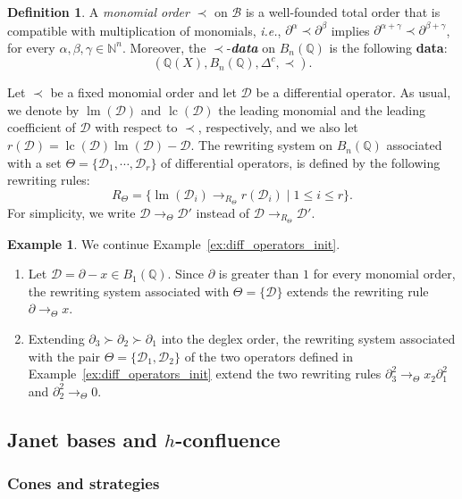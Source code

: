 \documentclass[10pt]{easychair}
\theoremstyle{definition}
\newtheorem{definition}[theorem]{Definition}
\newtheorem{example}[theorem]{Example}
\newcommand\ie{\emph{i.e.}}
\newcommand\data{{\color{red}\bf data}}
\newcommand\D{\mathcal{D}}
\DeclareMathOperator{\lm}{lm}
\DeclareMathOperator{\lc}{lc}
\newcommand\basis{\mathscr{B}}
\newcommand\Q{\mathbb{Q}}
\newcommand\N{\mathbb{N}}
\newcommand\Weyl[1]{B_{#1}(\Q)}
\newcommand\rewTheta{\to_{\Theta}}
\begin{document}
\begin{definition}
  A {\em monomial order} $\prec$ on $\basis$ is a well-founded total
  order that is compatible with multiplication of monomials, \ie,
  $\partial^{\alpha}\prec\partial^{\beta}$ implies 
  $\partial^{\alpha+\gamma}\prec\partial^{\beta+\gamma}$, for every
  $\alpha,\beta,\gamma\in\N^n$. Moreover, the $\prec$-{\it \data} on
  $\Weyl{n}$ is the following \data:
  \[(\Q(X),\Weyl{n},\Delta^c,\prec).\]
\end{definition}
\smallskip

Let $\prec$ be a fixed monomial order and let $\D$ be a differential
operator. As usual, we denote by $\lm(\D)$ and $\lc(\D)$ the leading
monomial and the leading coefficient of $\D$ with respect to $\prec$,
respectively, and we also let $r(\D)=\lc(\D)\lm(\D)-\D$. The rewriting
system on $\Weyl{n}$ associated with a set $\Theta=\{\D_1,\cdots,\D_r\}$
of differential operators, is defined by the following rewriting rules:
\[R_{\Theta}=\Big\{\lm(\D_i)\to_{R_\Theta}r(\D_i)\mid 1\leq i\leq r
\Big\}.\]
For simplicity, we write $\D\rewTheta\D'$ instead of
$\D\to_{R_\Theta}\D'$.
\smallskip

\begin{example}
  We continue Example~\ref{ex:diff_operators_init}.
  \begin{enumerate}
  \item Let $\D=\partial-x\in\Weyl{1}$. Since $\partial$ is greater than
    $1$ for every monomial order, the rewriting system associated with
    $\Theta=\{\D\}$ extends the rewriting rule $\partial\rewTheta x$.
  \item Extending $\partial_3\succ\partial_2\succ\partial_1$ into the
    deglex order, the rewriting system associated with the pair
    $\Theta=\{\D_1,\D_2\}$ of the two operators defined in
    Example~\ref{ex:diff_operators_init} extend the two rewriting rules
    $\partial_3^2\rewTheta x_2\partial_1^2$ and
    $\partial_2^2\rewTheta 0$.
  \end{enumerate}
\end{example}
\smallskip

\subsection{Janet bases and $h$-confluence}
\label{sec:Janet_bases_and_h_confluence}

\subsubsection{Cones and strategies}
\end{document}
